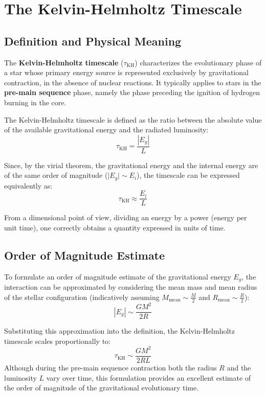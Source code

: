 \section{The Kelvin-Helmholtz Timescale}

\subsection{Definition and Physical Meaning}
The \textbf{Kelvin-Helmholtz timescale} ($\tau_{\text{KH}}$) characterizes the evolutionary phase of a star whose primary energy source is represented exclusively by gravitational contraction, in the absence of nuclear reactions. It typically applies to stars in the \textbf{pre-main sequence} phase, namely the phase preceding the ignition of hydrogen burning in the core.

The Kelvin-Helmholtz timescale is defined as the ratio between the absolute value of the available gravitational energy and the radiated luminosity:
\begin{equation}
\tau_{\text{KH}} = \frac{|E_g|}{L}
\end{equation}

Since, by the virial theorem, the gravitational energy and the internal energy are of the same order of magnitude ($\vert{}E_g\vert{} \sim E_i$), the timescale can be expressed equivalently as:
\begin{equation}
\tau_{\text{KH}} \approx \frac{E_i}{L}
\end{equation}

From a dimensional point of view, dividing an energy by a power (energy per unit time), one correctly obtains a quantity expressed in units of time.

\subsection{Order of Magnitude Estimate}
To formulate an order of magnitude estimate of the gravitational energy $E_g$, the interaction can be approximated by considering the mean mass and mean radius of the stellar configuration (indicatively assuming $M_{\text{mean}} \sim \frac{M}{2}$ and $R_{\text{mean}} \sim \frac{R}{2}$):
\begin{equation}
|E_g| \sim \frac{G M^2}{2R}
\end{equation}

Substituting this approximation into the definition, the Kelvin-Helmholtz timescale scales proportionally to:
\begin{equation}
\tau_{\text{KH}} \sim \frac{G M^2}{2 R L}
\end{equation}
Although during the pre-main sequence contraction both the radius $R$ and the luminosity $L$ vary over time, this formulation provides an excellent estimate of the order of magnitude of the gravitational evolutionary time.

